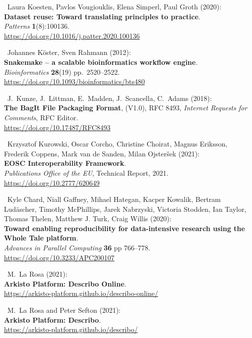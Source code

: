 \begin{thebibliography}{9}
~Laura Koesten, Pavlos Vougiouklis, Elena Simperl, Paul Groth
(2020):\\
\textbf{Dataset reuse: Toward translating principles to practice}.\\
\emph{Patterns} \textbf{1}(8):100136.\\
\url{https://doi.org/10.1016/j.patter.2020.100136}

~Johannes Köster, Sven Rahmann (2012):\\
\textbf{Snakemake -- a scalable bioinformatics workflow engine}.\\
\emph{Bioinformatics} \textbf{28}(19) pp.~2520--2522.\\
\url{https://doi.org/10.1093/bioinformatics/bts480}

~J.~Kunze, J.~Littman, E.~Madden, J.~Scancella, C.~Adams
(2018):\\
\textbf{The BagIt File Packaging Format}, (V1.0), RFC 8493,
\emph{Internet Requests for Comments}, RFC Editor.\\
\url{https://doi.org/10.17487/RFC8493}

~Krzysztof Kurowski, Oscar Corcho, Christine Choirat, Magnus
Eriksson, Frederik Coppens, Mark van de Sanden, Milan Ojsteršek
(2021):\\
\textbf{EOSC Interoperability Framework}.\\
\emph{Publications Office of the EU}, Technical Report, 2021.\\
\url{https://doi.org/10.2777/620649}

~Kyle Chard, Niall Gaffney, Mihael Hategan, Kacper Kowalik,
Bertram Ludäscher, Timothy McPhillips, Jarek Nabrzyski, Victoria
Stodden, Ian Taylor, Thomas Thelen, Matthew J. Turk, Craig Willis
(2020):\\
\textbf{Toward enabling reproducibility for data-intensive research
using the Whole Tale platform}.\\
\emph{Advances in Parallel Computing} \textbf{36} pp 766--778.\\
\url{https://doi.org/10.3233/APC200107}

~M.~La Rosa (2021):\\
\textbf{Arkisto Platform: Describo Online}.\\
\url{https://arkisto-platform.github.io/describo-online/}

~M.~La Rosa and Peter Sefton (2021):\\
\textbf{Arkisto Platform: Describo}.\\
\url{https://arkisto-platform.github.io/describo/}


\end{thebibliography}
